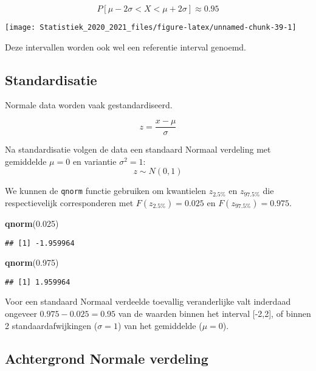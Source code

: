 \documentclass[
  12pt,dutch,coursenotes]{book}
\newenvironment{Shaded}{\begin{snugshade}}{\end{snugshade}}
\newcommand{\FloatTok}[1]{\textcolor[rgb]{0.00,0.00,0.81}{#1}}
\newcommand{\KeywordTok}[1]{\textcolor[rgb]{0.13,0.29,0.53}{\textbf{#1}}}
\newcommand{\NormalTok}[1]{#1}
\theoremstyle{definition}
\theoremstyle{definition}
\theoremstyle{definition}
\theoremstyle{remark}
\begin{document}
\[P[\mu - 2 \sigma < X < \mu + 2 \sigma]\approx 0.95\]

\begin{center}\texttt{[image: Statistiek\_2020\_2021\_files/figure-latex/unnamed-chunk-39-1]} \end{center}

Deze intervallen worden ook wel een referentie interval genoemd.

\hypertarget{standardisatie}{%
\subsection{Standardisatie}\label{standardisatie}}

Normale data worden vaak gestandardiseerd.

\[z=\frac{x-\mu}{\sigma}\]

Na standardisatie volgen de data een standaard Normaal verdeling met gemiddelde \(\mu=0\) en variantie \(\sigma^2=1\):
\[z \sim N(0,1)\]

We kunnen de \texttt{qnorm} functie gebruiken om kwantielen \(z_{2.5\%}\) en \(z_{97.5\%}\) die respectievelijk corresponderen met \(F(z_{2.5\%})=0.025\) en \(F(z_{97.5\%})=0.975\).

\begin{Shaded}
\begin{Highlighting}[]
\KeywordTok{qnorm}\NormalTok{(}\FloatTok{0.025}\NormalTok{)}
\end{Highlighting}
\end{Shaded}

\begin{verbatim}
## [1] -1.959964
\end{verbatim}

\begin{Shaded}
\begin{Highlighting}[]
\KeywordTok{qnorm}\NormalTok{(}\FloatTok{0.975}\NormalTok{)}
\end{Highlighting}
\end{Shaded}

\begin{verbatim}
## [1] 1.959964
\end{verbatim}

Voor een standaard Normaal verdeelde toevallig veranderlijke valt inderdaad ongeveer \(0.975 - 0.025=0.95\) van de waarden binnen het interval {[}-2,2{]}, of binnen 2 standaardafwijkingen (\(\sigma=1\)) van het gemiddelde (\(\mu=0\)).

\hypertarget{subsec:normalcalc}{%
\subsection{Achtergrond Normale verdeling}\label{subsec:normalcalc}}
\end{document}
